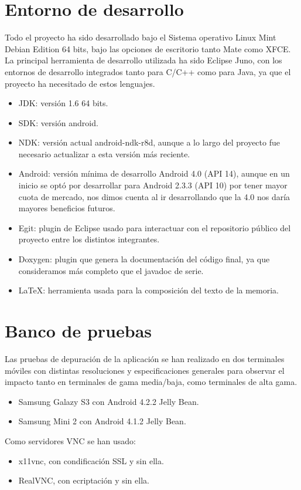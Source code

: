 \section{Entorno de desarrollo}
Todo el proyecto ha sido desarrollado bajo el Sistema operativo Linux Mint Debian Edition 64 bits, bajo las opciones de escritorio tanto Mate como XFCE.\\

La principal herramienta de desarrollo utilizada ha sido Eclipse Juno, con los entornos de desarrollo integrados tanto para C/C++ como para Java, ya que el proyecto ha necesitado de estos lenguajes.
\begin{itemize}
\item JDK: versión 1.6 64 bits.
\item SDK: versión android.
\item NDK: versión actual android-ndk-r8d, aunque a lo largo del proyecto fue necesario actualizar a esta versión más reciente.
\item Android: versión mínima de desarrollo Android 4.0 (API 14), aunque en un inicio se optó por desarrollar para Android 2.3.3 (API 10) por tener mayor cuota de mercado, nos dimos cuenta al ir desarrollando que la 4.0 nos daría mayores beneficios futuros.
\item Egit: plugin de Eclipse usado para interactuar con el repositorio público del proyecto entre los distintos integrantes.
\item Doxygen: plugin que genera la documentación del código final, ya que consideramos más completo que el javadoc de serie.
\item LaTeX: herramienta usada para la composición del texto de la memoria.
\end{itemize}
\newpage
\section{Banco de pruebas}
Las pruebas de depuración de la aplicación se han realizado en dos terminales móviles con distintas resoluciones y especificaciones generales para observar el impacto tanto en terminales de gama media/baja, como terminales de alta gama.
\begin{itemize}
\item Samsung Galazy S3 con Android 4.2.2 Jelly Bean.
\item Samsung Mini 2 con Android 4.1.2 Jelly Bean.
\end{itemize}

Como servidores VNC se han usado:
\begin{itemize}
\item x11vnc, con condificación SSL y sin ella.
\item RealVNC, con ecriptación y sin ella.
\end{itemize}
